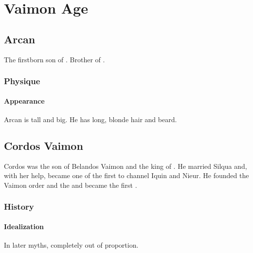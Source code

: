 \chapter{Vaimon Age}
\section{Arcan \Delaen}
The firstborn son of . 
Brother of . 









\subsection{Physique}
\subsubsection{Appearance}
Arcan is tall and big. 
He has long, blonde hair and beard. 















\section{Cordos Vaimon}
Cordos was the son of Belandos Vaimon and the king of \Imrath{}. 
He married Silqua \Delaen and, with her help, became one of the first \humans{} to channel Iquin and Nieur. 
He founded the Vaimon order and the \VaimonCaliphate and became the first \VaimonCaliph. 









\subsection{History}





\subsubsection{Idealization}
In later myths,  completely out of proportion.















